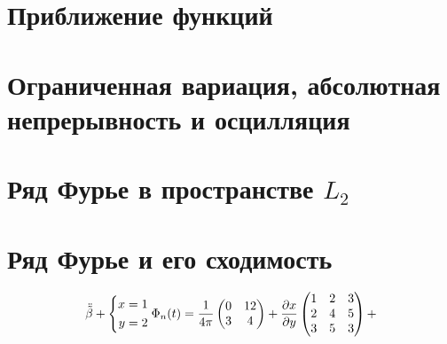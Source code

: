 


% 

\section{Приближение функций}



\section{Ограниченная вариация, абсолютная непрерывность и осцилляция}



\section{Ряд Фурье в пространстве \texorpdfstring{$L_2$}{L2}}



\section{Ряд Фурье и его сходимость}




\begin{equation*}
    \ddot{\mbox{\boldmath $\tilde{\beta}$}} + \left\{\begin{aligned}
        x &= 1 \\
        y &= 2
    \end{aligned}\right.
    \Phi_n(t) = \frac{1}{4\pi} \begin{pmatrix}
        0 & 12 \\
        3 & 4 \\
    \end{pmatrix} + \frac{\partial x}{\partial y} 
    \begin{pmatrix}
        1 & 2 & 3 \\
        2 & 4 & 5 \\
        3 & 5 & 3 \\
    \end{pmatrix} + 
\end{equation*}